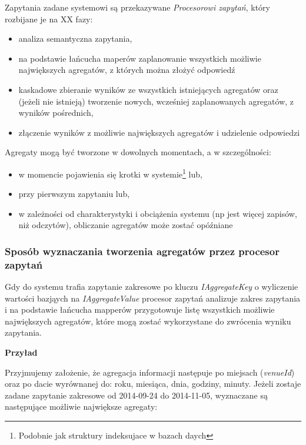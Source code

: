 Zapytania zadane systemowi są przekazywane \emph{Procesorowi zapytań}, który rozbijane je na XX fazy:

\begin{itemize}[noitemsep]
  \item analiza semantyczna zapytania,
  \item na podstawie łańcucha maperów zaplanowanie wszystkich możliwie największych agregatów, z których można złożyć odpowiedź
  \item kaskadowe zbieranie wyników ze wszystkich istniejących agregatów oraz (jeżeli nie istnieją) tworzenie nowych, wcześniej zaplanowanych agregatów, z wyników pośrednich,
  \item złączenie wyników z możliwie największych agregatów i udzielenie odpowiedzi
\end{itemize}

Agregaty mogą być tworzone w dowolnych momentach, a w szczególności:

\begin{itemize}[noitemsep]
  \item w momencie pojawienia się krotki w systemie\footnote{Podobnie jak struktury indeksujace w bazach daych} lub,
  \item przy pierwszym zapytaniu lub,
  \item w zależności od charakterystyki i obciążenia systemu (np jest więcej zapisów, niż odczytów), obliczanie agregatów może zostać opóźniane
\end{itemize}

\subsubsection{Sposób wyznaczania tworzenia agregatów przez procesor zapytań}

Gdy do systemu trafia zapytanie zakresowe po kluczu \emph{IAggregateKey} o wyliczenie wartości bazjąych na \emph{IAggregateValue} procesor zapytań analizuje zakres zapytania i na podstawie łańcucha mapperów przygotowuje listę wszystkich możliwie największych agregatów, które mogą zostać wykorzystane do zwrócenia wyniku zapytania.

\textbf{Przyład}

Przyjmujemy założenie, że agregacja informacji następuje po miejsach (\emph{venueId}) oraz po dacie wyrównanej do: roku, miesiąca, dnia, godziny, minuty. Jeżeli zostaje zadane zapytanie zakresowe od 2014-09-24 do 2014-11-05, wyznaczane są następujące możliwie największe agregaty:

